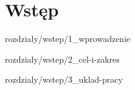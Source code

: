 \chapter{Wstęp}
\label {ch: wstep}

 {rozdzialy/wstep/1_wprowadzenie}

 {rozdzialy/wstep/2_cel-i-zakres}

 {rozdzialy/wstep/3_uklad-pracy}
